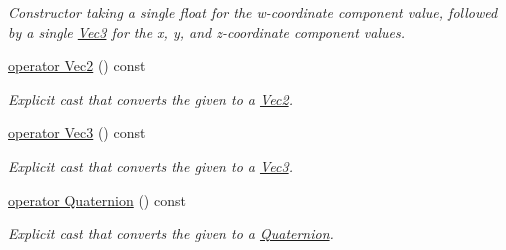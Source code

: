 \begin{DoxyCompactItemize}
\begin{DoxyCompactList}\small\item\em Constructor taking a single float for the w-\/coordinate component value, followed by a single \hyperlink{classgfxmath_1_1_vec3}{Vec3} for the x, y, and z-\/coordinate component values. \end{DoxyCompactList}\item 
\hyperlink{classgfxmath_1_1_vec4_ad62fa2df15d4caf6e62b1a1374dc6ea7}{operator Vec2} () const 
\begin{DoxyCompactList}\small\item\em Explicit cast that converts the given to a \hyperlink{classgfxmath_1_1_vec2}{Vec2}. \end{DoxyCompactList}\item 
\hyperlink{classgfxmath_1_1_vec4_a451f6c531cdd3615faaf9c2fc014e4c5}{operator Vec3} () const 
\begin{DoxyCompactList}\small\item\em Explicit cast that converts the given to a \hyperlink{classgfxmath_1_1_vec3}{Vec3}. \end{DoxyCompactList}\item 
\hyperlink{classgfxmath_1_1_vec4_aaf08e3ea9dc716a152e096276d89f429}{operator Quaternion} () const 
\begin{DoxyCompactList}\small\item\em Explicit cast that converts the given to a \hyperlink{classgfxmath_1_1_quaternion}{Quaternion}. \end{DoxyCompactList}\end{DoxyCompactItemize}
